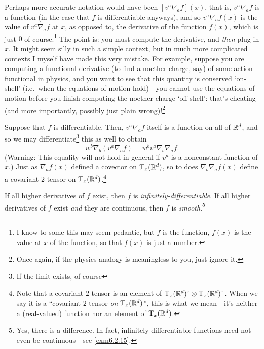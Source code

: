 \begin{dfn}
\begin{rmk}
Perhaps more accurate notation would have been $[v^a\nabla _af](x)$, that is, $v^a\nabla _af$ is a function (in the case that $f$ is differentiable anyways), and so $v^a\nabla _af(x)$ is the value of $v^a\nabla _af$ at $x$, as opposed to, the derivative of the function $f(x)$, which is just $0$ of course.\footnote{I know to some this may seem pedantic, but $f$ is the function, $f(x)$ is the value at $x$ of the function, so that $f(x)$ is just a number.}  The point is:  you must compute the derivative, and \emph{then} plug-in $x$.  It might seem silly in such a simple context, but in much more complicated contexts I myself have made this very mistake.  For example, suppose you are computing a functional derivative (to find a noether charge, say) of some action functional in physics, and you want to see that this quantity is conserved `on-shell' (i.e.~when the equations of motion hold)---you cannot use the equations of motion before you finish computing the noether charge `off-shell':  that's cheating (and more importantly, possibly just plain wrong)!\footnote{Once again, if the physics analogy is meaningless to you, just ignore it.}
\end{rmk}
\begin{rmk}
Suppose that $f$ is differentiable.  Then, $v^a\nabla _af$ itself is a function on all of $\R ^d$, and so we may differentiate\footnote{If the limit exists, of course} this as well to obtain
\begin{equation}
w^b\nabla _b(v^a\nabla _af)=w^bv^a\nabla _b\nabla _af.
\end{equation}
(Warning:  This equality will not hold in general if $v^a$ is a nonconstant function of $x$.)  Just as $\nabla _af(x)$ defined a covector on $\tangent{\R ^d}{x}$, so to does $\nabla _b\nabla _af(x)$ define a covariant $2$-tensor on $\tangent{\R ^d}{x}$.\footnote{Note that a covariant $2$-tensor is an element of $\tangent{\R ^d}{x}^\dagger \otimes \tangent{\R ^d}{x}^\dagger$.  When we say it is a ``covariant $2$-tensor \emph{on} $\tangent{\R ^d}{x}$'', this is what we mean---it's neither a (real-valued) function nor an element of $\tangent{\R ^d}{x}$.}
\end{rmk}
\begin{rmk}
If all higher derivatives of $f$ exist, then $f$ is \emph{infinitely-differentiable}.  If all higher derivatives of $f$ exist \emph{and} they are continuous, then $f$ is \emph{smooth}.\footnote{Yes, there is a difference.  In fact, infinitely-differentiable functions need not even be continuous---see \cref{exm6.2.15}.}
\end{rmk}
\end{dfn}
